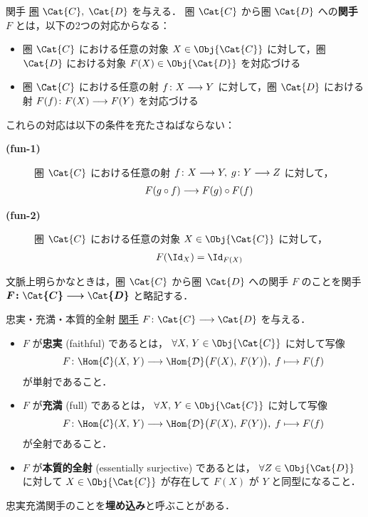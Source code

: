 \documentclass[TQFT_main]{subfiles}
\begin{document}
\begin{mydef}[label=def:functor]{関手}
    \hyperref[def:category]{圏} $\Cat{C},\; \Cat{D}$ を与える．
    圏 $\Cat{C}$ から圏 $\Cat{D}$ への\textbf{関手} $F$ とは，以下の2つの対応からなる：
    \begin{itemize}
        \item 圏 $\Cat{C}$ における任意の対象 $X \in \Obj{\Cat{C}}$ に対して，圏 $\Cat{D}$ における対象 $F(X) \in \Obj{\Cat{D}}$ を対応づける
        \item 圏 $\Cat{C}$ における任意の射 $f \colon X \longrightarrow Y$ に対して，圏 $\Cat{D}$ における射 $F(f) \colon F(X) \longrightarrow F(Y)$ を対応づける
    \end{itemize}
    これらの対応は以下の条件を充たさねばならない：
    \begin{description}
        \item[\textbf{(fun-1)}]  圏 $\Cat{C}$ における任意の射 $f \colon X \longrightarrow Y,\; g \colon Y \longrightarrow Z$ に対して，
        \begin{align}
            F(g \circ f) \longrightarrow F(g) \circ F(f)
        \end{align}
        \item[\textbf{(fun-2)}]  圏 $\Cat{C}$ における任意の対象 $X \in \Obj{\Cat{C}}$ に対して，
        \begin{align}
            F (\Id_{X}) = \Id_{F(X)}
        \end{align}
    \end{description}
    
    \tcblower

    文脈上明らかなときは，圏 $\Cat{C}$ から圏 $\Cat{D}$ への関手 $F$ のことを関手 $\bm{F \colon \Cat{C} \lto \Cat{D}}$ と略記する．
\end{mydef}

\begin{mydef}[label=def:faithful]{忠実・充満・本質的全射}
    \hyperref[def:functor]{関手} $F \colon \Cat{C} \longrightarrow \Cat{D}$ を与える．
    \begin{itemize}
        \item $F$ が\textbf{忠実} (faithful) であるとは， $\forall X,\,Y \in \Obj{\Cat{C}}$ に対して写像
        \begin{align}
            F \colon \Hom{\mathcal{C}}(X,\, Y) \longrightarrow \Hom{\mathcal{D}} \bigl( F(X),\, F(Y) \bigr),\; f \longmapsto F(f)
        \end{align}
        が単射であること．
        \item $F$ が\textbf{充満} (full) であるとは， $\forall X,\,Y \in \Obj{\Cat{C}}$ に対して写像
        \begin{align}
            F \colon \Hom{\mathcal{C}}(X,\, Y) \longrightarrow \Hom{\mathcal{D}} \bigl( F(X),\, F(Y) \bigr),\; f \longmapsto F(f)
        \end{align}
        が全射であること．
        \item $F$ が\textbf{本質的全射} (essentially surjective) であるとは， $\forall Z \in \Obj{\Cat{D}}$ に対して $X \in \Obj{\Cat{C}}$ が存在して $F(X)$ が $Y$ と同型になること．
    \end{itemize}
    忠実充満関手のことを\textbf{埋め込み}と呼ぶことがある．
\end{mydef}
\end{document}
